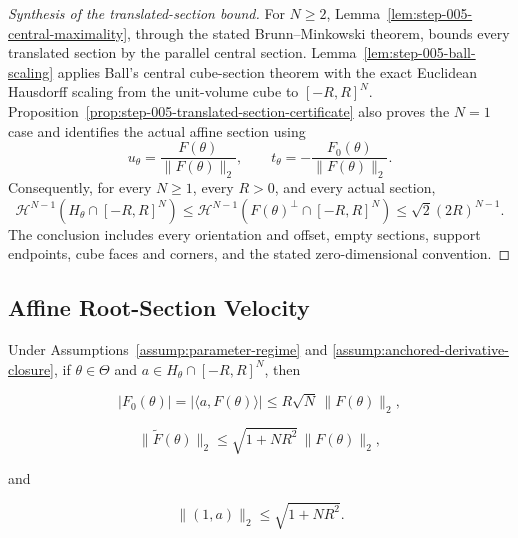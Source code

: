\begin{proof}[Synthesis of the translated-section bound]
For $N\geq2$, Lemma~\ref{lem:step-005-central-maximality}, through the
stated Brunn--Minkowski theorem, bounds every translated section by the
parallel central section.  Lemma~\ref{lem:step-005-ball-scaling} applies
Ball's central cube-section theorem with the exact Euclidean Hausdorff
scaling from the unit-volume cube to $[-R,R]^N$.  Proposition~\ref{prop:step-005-translated-section-certificate}
also proves the $N=1$ case and identifies the actual affine section using
\begin{equation}
\label{eq:appendix-display-172}
u_\theta=\frac{F(\theta)}{\|F(\theta)\|_2},
\qquad
t_\theta=-\frac{F_0(\theta)}{\|F(\theta)\|_2}.
\end{equation}
Consequently, for every $N\geq1$, every $R>0$, and every actual section,
\begin{equation}
\label{eq:appendix-display-173}
\mathcal H^{N-1}(H_\theta\cap[-R,R]^N)
\leq
\mathcal H^{N-1}(F(\theta)^\perp\cap[-R,R]^N)
\leq\sqrt2(2R)^{N-1}.
\end{equation}
The conclusion includes every orientation and offset, empty sections, support
endpoints, cube faces and corners, and the stated zero-dimensional convention.
\end{proof}

\subsection{Affine Root-Section Velocity}\label{app:step-006}

\begin{lemma}
\label{lem:step-006-s2-root-coupling}

Under Assumptions~\ref{assump:parameter-regime} and
\ref{assump:anchored-derivative-closure}, if \(\theta\in\Theta\) and
\(a\in H_\theta\cap[-R,R]^N\), then

\begin{equation}
\lvert F_0(\theta)\rvert
=\lvert\langle a,F(\theta)\rangle\rvert
\leq R\sqrt N\,\lVert F(\theta)\rVert_2,
\label{eq:step-006-root-f0}
\end{equation}

\begin{equation}
\lVert\widetilde F(\theta)\rVert_2
\leq\sqrt{1+NR^2}\,\lVert F(\theta)\rVert_2,
\label{eq:step-006-augmented-bound}
\end{equation}

and

\begin{equation}
\lVert(1,a)\rVert_2\leq\sqrt{1+NR^2}.
\label{eq:step-006-coefficient-bound}
\end{equation}


\end{lemma}

